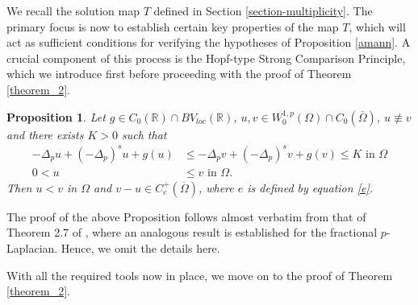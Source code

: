 \documentclass[reqno,oneside]{amsart}
\newtheorem{proposition}[theorem]{Proposition}
\theoremstyle{definition}
\theoremstyle{remark}
\numberwithin{equation}{section}
\newcommand{\p}{\Delta_p}
\newcommand{\ps}{(-\Delta_p)^s}
\newcommand{\Om} {\Omega}
\newcommand{\sr}{\mathbb{R}}
\newcommand{\wop}{W^{1,p}_0 (\Omega)}
\newcommand{\omc}{(\overline{\Om})}
\begin{document}
We recall the solution map $T$ defined in Section \ref{section-multiplicity}. The primary focus is now to establish certain key properties of the map $T$, which will act as sufficient conditions for verifying the hypotheses of Proposition \ref{amann}. A crucial component of this process is the Hopf-type Strong Comparison Principle, which we introduce first before proceeding with the proof of Theorem \ref{theorem_2}.

\begin{proposition}\label{nonsingular_SCP}
    Let $g\in C_0 (\sr)\cap BV_{loc}(\sr) $, $u,v \in \wop\cap C_0 \omc$, $u \not\equiv v$ and there exists $K>0$ such that
    \begin{equation*}
        \begin{aligned}
            -\p u + \ps u +g(u) &\leq -\p v + \ps v +g(v) \leq K \text{ in } \Om\\
            0< u &\leq v \text{ in } \Om.
        \end{aligned}
    \end{equation*}
    Then $u<v$ in $\Om$ and $v-u \in C_e^+ \omc$, where $e$ is defined by equation \eqref{e}.
\end{proposition}

The proof of the above Proposition follows almost verbatim from that of Theorem 2.7 of \cite{iannizzotto2023logistic}, where an analogous result is established for the fractional $p$-Laplacian. Hence, we omit the details here.

With all the required tools now in place, we move on to the proof of Theorem \ref{theorem_2}.
\end{document}
